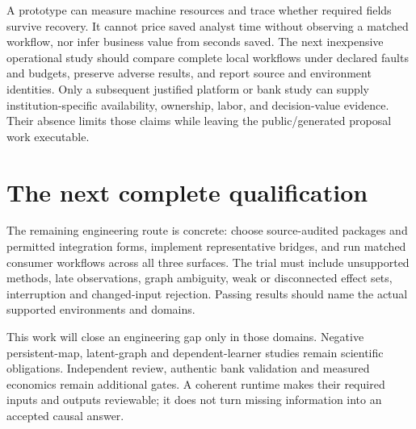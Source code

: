 A prototype can measure machine resources and trace whether required fields
survive recovery. It cannot price saved analyst time without observing a
matched workflow, nor infer business value from seconds saved. The next
inexpensive operational study should compare complete local workflows under
declared faults and budgets, preserve adverse results, and report source and
environment identities. Only a subsequent justified platform or bank study
can supply institution-specific availability, ownership, labor, and
decision-value evidence. Their absence limits those claims while leaving
the public/generated proposal work executable.

\section{The next complete qualification}

The remaining engineering route is concrete: choose source-audited packages
and permitted integration forms, implement representative bridges, and run
matched consumer workflows across all three surfaces. The trial must include
unsupported methods, late observations, graph ambiguity, weak or disconnected
effect sets, interruption and changed-input rejection. Passing results should
name the actual supported environments and domains.

This work will close an engineering gap only in those domains. Negative
persistent-map, latent-graph and dependent-learner studies remain scientific
obligations. Independent review, authentic bank validation and measured
economics remain additional gates. A coherent runtime makes their required
inputs and outputs reviewable; it does not turn missing information into an
accepted causal answer.

\label{exec13:operations-end}

